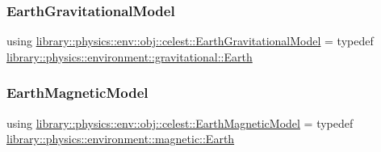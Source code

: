 \subsubsection{\texorpdfstring{Earth\+Gravitational\+Model}{EarthGravitationalModel}}
{\footnotesize\ttfamily using \hyperlink{namespacelibrary_1_1physics_1_1env_1_1obj_1_1celest_ae5b7a35477a26407f850ec326fb2b2fd}{library\+::physics\+::env\+::obj\+::celest\+::\+Earth\+Gravitational\+Model} = typedef \hyperlink{classlibrary_1_1physics_1_1environment_1_1gravitational_1_1_earth}{library\+::physics\+::environment\+::gravitational\+::\+Earth}}

\mbox{\label{namespacelibrary_1_1physics_1_1env_1_1obj_1_1celest_a50039ec894b1106df38eb53bf051b658}} 
\subsubsection{\texorpdfstring{Earth\+Magnetic\+Model}{EarthMagneticModel}}
{\footnotesize\ttfamily using \hyperlink{namespacelibrary_1_1physics_1_1env_1_1obj_1_1celest_a50039ec894b1106df38eb53bf051b658}{library\+::physics\+::env\+::obj\+::celest\+::\+Earth\+Magnetic\+Model} = typedef \hyperlink{classlibrary_1_1physics_1_1environment_1_1magnetic_1_1_earth}{library\+::physics\+::environment\+::magnetic\+::\+Earth}}

